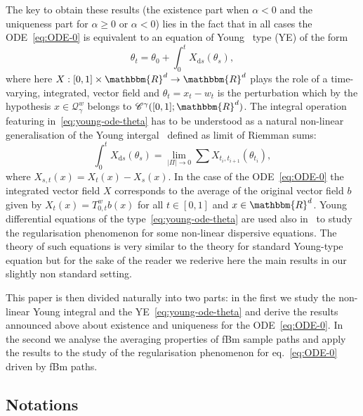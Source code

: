 \documentclass[a4paper,11pt]{article}
\newcommand{\mathd}{\mathrm{d}}
\newcommand{\CC}{\mathscr C}
\newcommand{\CQ}{\mathscr Q}
\begin{document}
The key to obtain these results (the existence part when $\alpha <0$ and the
uniqueness part for $\alpha \geqslant 0$ or $\alpha <0$) lies in the fact that
in all cases the ODE~{\eqref{eq:ODE-0}} is equivalent to an equation of Young
\ type (YE) of the form
\begin{equation}
  \theta_{t} = \theta_{0} + \int_{0}^{t} X_{\mathd s} ( \theta_{s} ),
  \label{eq:young-ode-theta}
\end{equation}
where here $X: [ 0,1 ] \times \mathbbm{R}^{d} \rightarrow \mathbbm{R}^{d}$
plays the role of a time-varying, integrated, vector field and $\theta_{t}
=x_{t} -w_{t}$ is the perturbation which by the hypothesis $x \in
\CQ^{w}_{\gamma}$ belongs to $\CC^{\gamma} ( [ 0,1 ] ;\mathbbm{R}^{d}
)$. The integral operation featuring in~{\eqref{eq:young-ode-theta}} has to be
understood as a natural non-linear generalisation of the Young
intergal~{\cite{Young}} defined as limit of Riemman sums:
\[ \int_{0}^{t} X_{\mathd s} ( \theta_{s} ) = \lim_{| \Pi | \rightarrow 0}
   \sum X_{t_{i} ,t_{i+1}} ( \theta_{t_{i}} ), \]
where $X_{s,t} ( x ) =X_{t} ( x ) -X_{s} ( x )$. In the case of the
ODE~{\eqref{eq:ODE-0}} the integrated vector field $X$ corresponds to the
average of the original vector field $b$ given by $X_{t} ( x ) =T_{0,t}^{w} b
( x )$ for all $t \in [ 0,1 ]$ and $x \in \mathbbm{R}^{d}$. Young differential
equations of the type~{\eqref{eq:young-ode-theta}} are used also
in~{\cite{random-modulation-1,random-modulation-2}} to study the regularisation phenomenon for some
non-linear dispersive equations. The theory of such equations is very similar
to the theory for standard Young-type equation but for the sake of the reader
we rederive here the main results in our slightly non standard setting.



This paper is then divided naturally into two parts: in the first we study the
non-linear Young integral and the YE~{\eqref{eq:young-ode-theta}} and derive
the results announced above about existence and uniqueness for the
ODE~{\eqref{eq:ODE-0}}. In the second we analyse the averaging properties of
fBm sample paths and apply the results to the study of the regularisation
phenomenon for eq.~{\eqref{eq:ODE-0}} driven by fBm paths.

\subsection{Notations}
\end{document}
